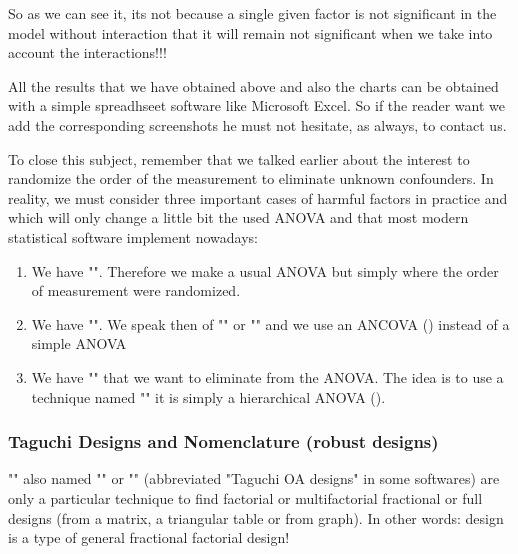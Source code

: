 	So as we can see it, its not because a single given factor is not significant in the model without interaction that it will remain not significant when we take into account the interactions!!!\\
	\begin{tcolorbox}[title=Remark,colframe=black,arc=10pt]
	All the results that we have obtained above and also the charts can be obtained with a simple spreadhseet software like Microsoft Excel. So if the reader want we add the corresponding screenshots he must not hesitate, as always, to contact us.
	\end{tcolorbox}
	To close this subject, remember that we talked earlier about the interest to randomize the order of the measurement to eliminate unknown confounders. In reality, we must consider three important cases of harmful factors in practice and which will only change a little bit the used ANOVA and that most modern statistical software implement nowadays:
	\begin{enumerate}
		\item We have "". Therefore we make a usual ANOVA but simply where the order of measurement were randomized.

		\item We have "". We speak then of "" or "" and we use an ANCOVA () instead of a simple ANOVA

		\item We have "" that we want to eliminate from the ANOVA. The idea is to use a technique named "" it is simply a hierarchical ANOVA ().
	\end{enumerate}
	
	\pagebreak
	\subsubsection{Taguchi Designs and Nomenclature (robust designs)}
	"" also named "" or "" (abbreviated "Taguchi OA designs" in some softwares) are only a particular technique to find factorial or multifactorial fractional or full designs (from a matrix, a triangular table or from graph). In other words: design is a type of general fractional factorial design!
	
